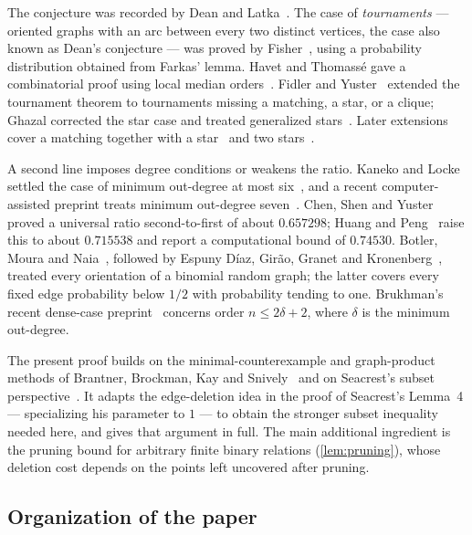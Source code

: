 The conjecture was recorded by Dean and Latka~\cite{DeanLatka1995}. The case of
\emph{tournaments} --- oriented graphs with an arc between every two distinct vertices, the case
also known as Dean's conjecture --- was proved by Fisher~\cite{Fisher1996}, using a probability
distribution obtained from Farkas' lemma. Havet and Thomass\'e gave a combinatorial proof using
local median orders~\cite{HavetThomasse2000}. Fidler and Yuster~\cite{FidlerYuster2007} extended
the tournament theorem to tournaments missing a matching, a star, or a clique; Ghazal corrected the
star case and treated generalized stars~\cite{Ghazal2012}. Later extensions cover a matching
together with a star~\cite{DaraFrancisJacobNarayanan2022} and two
stars~\cite{DaamouchAlMninyGhazal2025}.

A second line imposes degree conditions or weakens the ratio. Kaneko and Locke settled the case of
minimum out-degree at most six~\cite{KanekoLocke2001}, and a recent computer-assisted preprint
treats minimum out-degree seven~\cite{SadhukhanSandeepSen2026}. Chen, Shen and
Yuster~\cite{ChenShenYuster2003} proved a universal ratio second-to-first of about $0.657298$;
Huang and Peng~\cite{HuangPeng2024} raise this to about $0.715538$ and report a computational bound
of $0.74530$. Botler, Moura and Naia~\cite{BotlerMouraNaia2023}, followed by Espuny D\'iaz,
Gir\~ao, Granet and Kronenberg~\cite{EspunyDiazEtAl2025}, treated every orientation of a binomial
random graph; the latter covers every fixed edge probability below $1/2$ with probability tending
to one. Brukhman's recent dense-case preprint~\cite{Brukhman2026} concerns order $n\le 2\delta+2$,
where $\delta$ is the minimum out-degree.

The present proof builds on the minimal-counterexample and graph-product methods of Brantner,
Brockman, Kay and Snively~\cite{BrantnerBrockmanKaySnively2009} and on Seacrest's subset
perspective~\cite{Seacrest2019}. It adapts the edge-deletion idea in the proof of Seacrest's
Lemma~4 --- specializing his parameter to $1$ --- to obtain the stronger subset inequality needed
here, and gives that argument in full. The main additional ingredient is the pruning bound for
arbitrary finite binary relations (\cref{lem:pruning}), whose deletion cost depends on the points
left uncovered after pruning.

\subsection{Organization of the paper}\label{sec:organisation}

